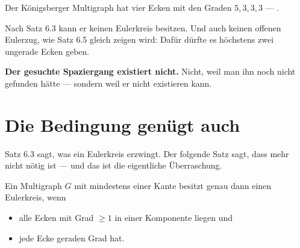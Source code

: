 \begin{merksatz}
Der Königsberger Multigraph hat vier Ecken mit den Graden $5, 3, 3, 3$ --- .

Nach Satz 6.3 kann er keinen Eulerkreis besitzen. Und auch keinen offenen Eulerzug, wie Satz 6.5 gleich zeigen wird: Dafür dürfte es höchstens zwei ungerade Ecken geben.

\begin{center}
\begin{minipage}{0.9\textwidth}
\textbf{Der gesuchte Spaziergang existiert nicht.} Nicht, weil man ihn noch nicht gefunden hätte --- sondern weil er nicht existieren kann.
\end{minipage}
\end{center}

\begin{center}
\begin{minipage}{0.88\textwidth}
\end{minipage}
\end{center}
\end{merksatz}

\section{Die Bedingung genügt auch}

Satz 6.3 sagt, was ein Eulerkreis erzwingt. Der folgende Satz sagt, dass mehr nicht nötig ist --- und das ist die eigentliche Überraschung.

\begin{merksatz}
Ein Multigraph $G$ mit mindestens einer Kante besitzt genau dann einen Eulerkreis, wenn
\begin{itemize}[leftmargin=1.4em, itemsep=2pt]
\item alle Ecken mit Grad $\ge 1$ in einer Komponente liegen und
\item jede Ecke geraden Grad hat.
\end{itemize}
\end{merksatz}

